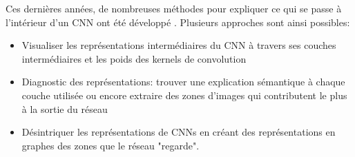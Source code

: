 \documentclass[12pt]{article}
\begin{document}
Ces dernières années, de nombreuses méthodes pour expliquer ce qui se passe à l'intérieur d'un CNN ont été développé \cite{zhang2018}. Plusieurs approches sont ainsi possibles:

\begin{itemize}
    \item Visualiser les représentations intermédiaires du CNN à travers ses couches intermédiaires et les poids des kernels de convolution
    \item Diagnostic des représentations: trouver une explication sémantique à chaque couche utilisée ou encore extraire des zones d'images qui contributent le plus à la sortie du réseau
    \item Désintriquer les représentations de CNNs en créant des représentations en graphes des zones que le réseau "regarde".
\end{itemize}

\clearpage



\end{document}
